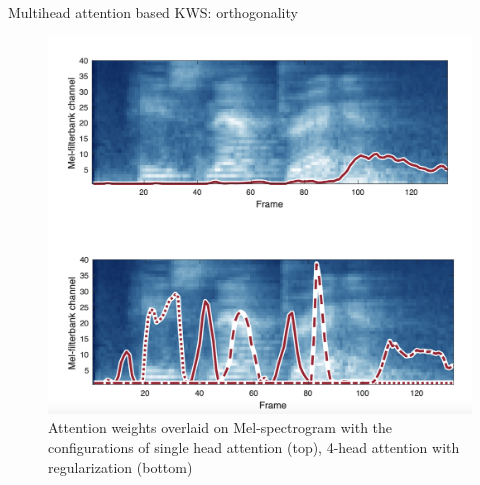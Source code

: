\begin{frame}{Multihead attention based KWS: orthogonality}
    \begin{figure}
    	\centering
    	\includegraphics[width=0.7\linewidth]{figs/ortho_attention.png}
    	\caption{Attention weights overlaid on Mel-spectrogram with the configurations of single head attention (top), 4-head attention with regularization (bottom)}
    \end{figure}

\end{frame}
